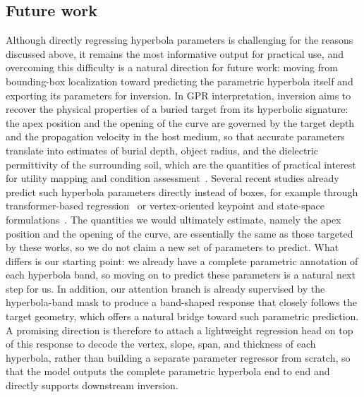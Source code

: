 \documentclass[lettersize,journal]{IEEEtran}
\begin{document}
\subsection{Future work}
Although directly regressing hyperbola parameters is challenging for the reasons
discussed above, it remains the most informative output for practical use, and
overcoming this difficulty is a natural direction for future work: moving from
bounding-box localization toward predicting the parametric hyperbola itself and
exporting its parameters for inversion. In GPR interpretation, inversion aims to
recover the physical properties of a buried target from its hyperbolic
signature: the apex position and the opening of the curve are governed by the
target depth and the propagation velocity in the host medium, so that accurate
parameters translate into estimates of burial depth, object radius, and the
dielectric permittivity of the surrounding soil, which are the quantities of
practical interest for utility mapping and condition
assessment~\cite{liu2022pipeline}. Several recent studies already predict such
hyperbola parameters directly instead of boxes, for example through
transformer-based regression~\cite{jin2024gprformer,ge2024gprtransunet} or
vertex-oriented keypoint and state-space
formulations~\cite{hou2025endtoend,lan2024statespace}. The quantities we would
ultimately estimate, namely the apex position and the opening of the curve, are
essentially the same as those targeted by these works, so we do not claim a new
set of parameters to predict. What differs is our starting point: we already
have a complete parametric annotation of each hyperbola band, so moving on to
predict these parameters is a natural next step for us. In addition, our
attention branch is already supervised by the hyperbola-band mask to produce a
band-shaped response that closely follows the target geometry, which offers a
natural bridge toward such parametric prediction. A promising direction is
therefore to attach a lightweight regression head on top of this response to
decode the vertex, slope, span, and thickness of each hyperbola, rather than
building a separate parameter regressor from scratch, so that the model outputs
the complete parametric hyperbola end to end and directly supports downstream
inversion.
\end{document}
